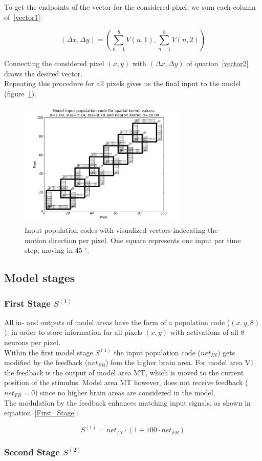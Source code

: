 \documentclass[a4paper]{article}
\begin{document}
To get the endpoints of the vector for the considered pixel, we sum each column of~\eqref{vector1}:

\begin{equation}
(\Delta x, \Delta y)=(\sum_{n=1}^{8}V(n,1),\sum_{n=1}^{8}V(n,2))
\label{vector2}
\end{equation}

Connecting the considered pixel $(x,y)$ with $(\Delta x, \Delta y)$ of quation~\eqref{vector2} draws the desired vector.\\
Repeating this procedure for all pixels gives us the final input to the model (figure~\ref{fig:input}).

\vspace{0.5cm}
\begin{figure}[ht]
\centering
\includegraphics[width=8cm]{pics/input}
\caption{Input population codes with visualized vectors indecating the motion direction per pixel. One square represents one input per time step, moving in 45 $^{\circ}$.}
\label{fig:input}
\end{figure}
\vspace{0.5cm}

\subsection{Model stages}
\subsubsection{First Stage $S^{(1)}$}

All in- and outputs of model areas have the form of a population code ($(x,y,8)$), in order to store information for all pixels $(x,y)$ with activations of all 8 neurons per pixel.\\
Within the first model stage $S^{(1)}$ the input population code ($net_{IN}$) gets modified by the feedback ($net_{FB}$) fom the higher brain area. For model area V1 the feedback is the output of model area MT, which is moved to the current position of the stimulus. Model area MT however, does not receive feedback ($net_{FB}=0$) since no higher brain areas are considered in the model.\\
The modulation by the feedback enhances matching input signals, as shown in equation~\eqref{First_Stage}:

\begin{equation}
S^{(1)}=net_{IN}\cdot(1+100\cdot net_{FB})
\label{First_Stage}
\end{equation}

\subsubsection{Second Stage $S^{(2)}$}
\end{document}
